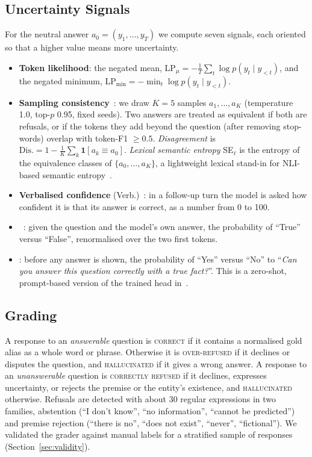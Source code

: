 \subsection{Uncertainty Signals}
For the neutral answer $a_0=(y_1,\dots,y_T)$ we compute seven signals, each oriented so that a higher value means more uncertainty.
\begin{itemize}
\item \textbf{Token likelihood}: the negated mean, LP$_\mu=-\frac{1}{T}\sum_t \log p(y_t\mid y_{<t})$, and the negated minimum, LP$_{\min}=-\min_t \log p(y_t\mid y_{<t})$.
\item \textbf{Sampling consistency}~\cite{manakul2023selfcheckgpt,kuhn2023semantic}: we draw $K{=}5$ samples $a_1,\dots,a_K$ (temperature 1.0, top-$p$ 0.95, fixed seeds). Two answers are treated as equivalent if both are refusals, or if the tokens they add beyond the question (after removing stop-words) overlap with token-F1 $\geq 0.5$. \emph{Disagreement} is $\text{Dis.}=1-\frac{1}{K}\sum_k \mathbf{1}[a_k\equiv a_0]$. \emph{Lexical semantic entropy} SE$_\ell$ is the entropy of the equivalence classes of $\{a_0,\dots,a_K\}$, a lightweight lexical stand-in for NLI-based semantic entropy~\cite{farquhar2024nature}.
\item \textbf{Verbalised confidence} (Verb.)~\cite{lin2022words,xiong2024express}: in a follow-up turn the model is asked how confident it is that its answer is correct, as a number from 0 to 100.
\item \textbf{\ptrue{}}~\cite{kadavath2022know}: given the question and the model's own answer, the probability of ``True'' versus ``False'', renormalised over the two first tokens.
\item \textbf{\pik{}}: before any answer is shown, the probability of ``Yes'' versus ``No'' to ``\emph{Can you answer this question correctly with a true fact?}''. This is a zero-shot, prompt-based version of the trained \pik{} head in~\cite{kadavath2022know}.
\end{itemize}

\subsection{Grading}
A response to an \emph{answerable} question is \textsc{correct} if it contains a normalised gold alias as a whole word or phrase. Otherwise it is \textsc{over-refused} if it declines or disputes the question, and \textsc{hallucinated} if it gives a wrong answer. A response to an \emph{unanswerable} question is \textsc{correctly refused} if it declines, expresses uncertainty, or rejects the premise or the entity's existence, and \textsc{hallucinated} otherwise. Refusals are detected with about 30 regular expressions in two families, abstention (``I don't know'', ``no information'', ``cannot be predicted'') and premise rejection (``there is no'', ``does not exist'', ``never'', ``fictional''). We validated the grader against manual labels for a stratified sample of responses (Section~\ref{sec:validity}).

